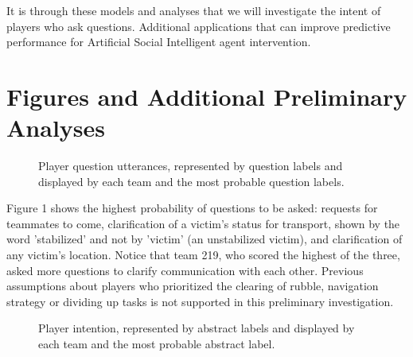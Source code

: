 It is through these models and analyses that we will investigate the intent of players who ask questions. Additional applications that can improve predictive performance for Artificial Social Intelligent agent intervention.


\section{Figures and Additional Preliminary Analyses}

\begin{figure}[h!]
    \centering
    \caption{Player question utterances, represented by question labels and displayed by each team and the most probable question labels.}
\end{figure}

Figure 1 shows the highest probability of questions to be asked: requests for teammates to come, clarification of a victim's status for transport, shown by the word 'stabilized' and not by 'victim' (an unstabilized victim), and clarification of any victim's location. Notice that team 219, who scored the highest of the three, asked more questions to clarify communication with each other. Previous assumptions about players who prioritized the clearing of rubble, navigation strategy or dividing up tasks is not supported in this preliminary investigation.


\begin{figure}[h!]
    \centering
    \caption{Player intention, represented by abstract labels and displayed by each team and the most probable abstract label. }
\end{figure}

